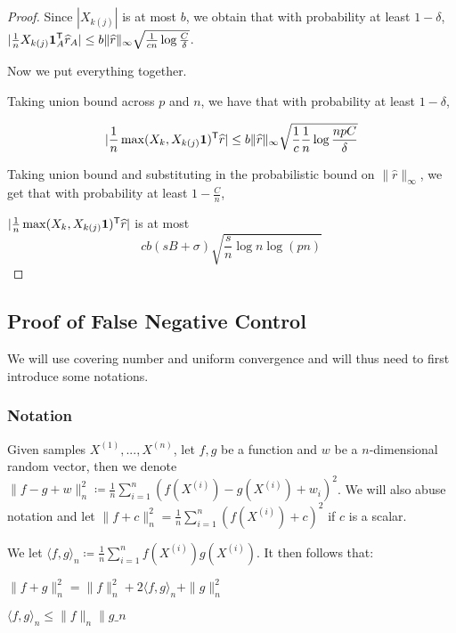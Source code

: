 \begin{proof}
Since $|X_{k(j)}|$ is at most $b$, we obtain that with probability at least $1-\delta$, $| \frac{1}{n} X_{k(j)} \mbox{\boldmath $1$}_A^{\mathsf{T}} \widehat{r}_A| \leq b\| \widehat{r} \|_\infty \sqrt{ \frac{1}{cn} \log \frac{C}{\delta}}$.

Now we put everything together.

Taking union bound across $p$ and $n$, we have that with probability at least $1-\delta$, 

\[
| \frac{1}{n} \max(X_k, X_{k(j)}\mbox{\boldmath $1$})^{\mathsf{T}} \widehat{r}| \leq b \|\widehat{r}\|_\infty \sqrt{ \frac{1}{c} \frac{1}{n} \log \frac{np C }{\delta}}
\]

Taking union bound and substituting in the probabilistic bound on $\|\hat{r}\|_\infty$, we get that with probability at least $1-\frac{C}{n}$,

$| \frac{1}{n} \max(X_k, X_{k(j)}\mbox{\boldmath $1$})^{\mathsf{T}} \widehat{r}|$ is at most 
\[
 c b (sB + \sigma) \sqrt{ \frac{s}{n} \log n \log (pn) }
\]

\end{proof}

 
 
 
 
 
 \subsection{Proof of False Negative Control}
 \label{sec:false_negative_proof}
 
 We will use covering number and uniform convergence and will thus need to first introduce some notations. 
 \subsubsection{Notation} 

 Given samples $X^{(1)},...,X^{(n)}$, let $f, g$ be a function and $w$ be a $n$-dimensional random vector, then we denote $\| f - g + w\|_n^2 \coloneqq \frac{1}{n} \sum_{i=1}^n ( f(X^{(i)}) - g(X^{(i)}) + w_i )^2$. We will also abuse notation and let $\| f + c \|_n^2 = \frac{1}{n} \sum_{i=1}^n (f(X^{(i)}) + c)^2$ if $c$ is a scalar.

We let $\langle f, g \rangle_n \coloneqq \frac{1}{n} \sum_{i=1}^n f(X^{(i)}) g(X^{(i)})$. It then follows that:
\begin{packed_enum}
\item $\| f + g \|_n^2 = \|f\|_n^2 + 2 \langle f, g \rangle_n + \|g \|_n^2$
\item $\langle f, g \rangle_n \leq \|f\|_n \| g \_n$
\end{packed_enum}

